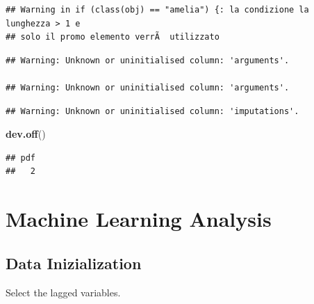\documentclass[]{article}
\newenvironment{Shaded}{\begin{snugshade}}{\end{snugshade}}
\newcommand{\KeywordTok}[1]{\textcolor[rgb]{0.13,0.29,0.53}{\textbf{#1}}}
\newcommand{\NormalTok}[1]{#1}
\begin{document}
\begin{verbatim}
## Warning in if (class(obj) == "amelia") {: la condizione la lunghezza > 1 e
## solo il promo elemento verrÃ  utilizzato
\end{verbatim}

\begin{verbatim}
## Warning: Unknown or uninitialised column: 'arguments'.

## Warning: Unknown or uninitialised column: 'arguments'.
\end{verbatim}

\begin{verbatim}
## Warning: Unknown or uninitialised column: 'imputations'.
\end{verbatim}

\begin{Shaded}
\begin{Highlighting}[]
\KeywordTok{dev.off}\NormalTok{()}
\end{Highlighting}
\end{Shaded}

\begin{verbatim}
## pdf 
##   2
\end{verbatim}

\hypertarget{machine-learning-analysis}{%
\section{Machine Learning Analysis}\label{machine-learning-analysis}}

\hypertarget{data-inizialization}{%
\subsection{Data Inizialization}\label{data-inizialization}}

Select the lagged variables.
\end{document}
